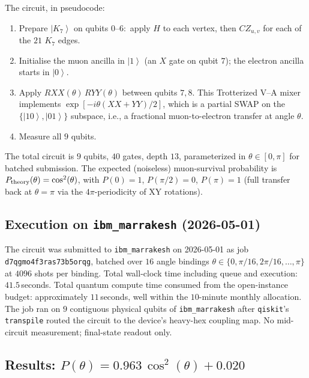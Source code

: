 \documentclass[11pt]{article}
\newcommand{\ket}[1]{\left|#1\right\rangle}
\begin{document}
The circuit, in pseudocode:
\begin{enumerate}
\item Prepare $\ket{K_7}$ on qubits $0$--$6$:\ apply $H$ to each
      vertex, then $CZ_{u, v}$ for each of the $21$ $K_7$ edges.
\item Initialise the muon ancilla in $\ket{1}$ (an $X$ gate on
      qubit $7$); the electron ancilla starts in $\ket{0}$.
\item Apply $RXX(\theta)\,RYY(\theta)$ between qubits $7, 8$.
      This Trotterized V--A mixer implements
      $\exp[-i\theta(XX + YY)/2]$, which is a partial SWAP on the
      $\{\ket{10}, \ket{01}\}$ subspace, i.e., a fractional
      muon-to-electron transfer at angle $\theta$.
\item Measure all $9$ qubits.
\end{enumerate}
The total circuit is $9$ qubits, $40$ gates, depth $13$,
parameterized in $\theta \in [0, \pi]$ for batched submission.
The expected (noiseless) muon-survival probability is
$P_{\rm theory}(\theta) = \cos^2(\theta)$, with $P(0) = 1$,
$P(\pi/2) = 0$, $P(\pi) = 1$ (full transfer back at $\theta = \pi$
via the $4\pi$-periodicity of XY rotations).

\subsection{Execution on \texttt{ibm\_marrakesh} (2026-05-01)}

The circuit was submitted to \texttt{ibm\_marrakesh} on 2026-05-01
as job \texttt{d7qgmo4f3ras73b5orqg}, batched over $16$ angle
bindings $\theta \in \{0, \pi/16, 2\pi/16, \ldots, \pi\}$ at
$4096$ shots per binding.  Total wall-clock time including queue
and execution: $41.5$\,seconds.  Total quantum compute time
consumed from the open-instance budget: approximately
$11$\,seconds, well within the $10$-minute monthly allocation.
The job ran on $9$ contiguous physical qubits of
\texttt{ibm\_marrakesh} after \texttt{qiskit}'s \texttt{transpile}
routed the circuit to the device's heavy-hex coupling map.  No
mid-circuit measurement; final-state readout only.

\subsection{Results: $P(\theta) = 0.963\,\cos^2(\theta) + 0.020$}
\end{document}

